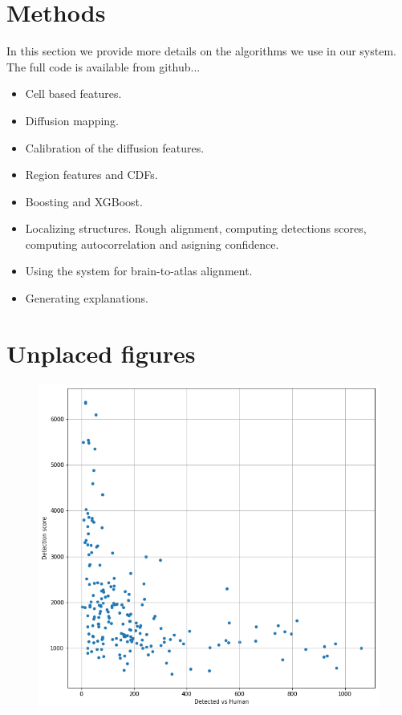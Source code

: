 \documentclass[runningheads]{llncs}
\begin{document}
\section{Methods}
In this section we provide more details on the algorithms we use in
our system. The full code is available from github...

\begin{itemize}
\item Cell based features.
\item Diffusion mapping.
\item Calibration of the diffusion features.
\item Region features and CDFs.
\item Boosting and XGBoost.
\item Localizing structures. Rough alignment, computing detections
  scores, computing autocorrelation and asigning confidence.
\item Using the system for brain-to-atlas alignment.
\item Generating explanations.
\end{itemize}

\section{Unplaced figures}

\begin{figure}[t]
  \includegraphics[width=\textwidth]{figures/DetectionConfidenceVsError.png}
  \caption{}
\end{figure}
\end{document}
